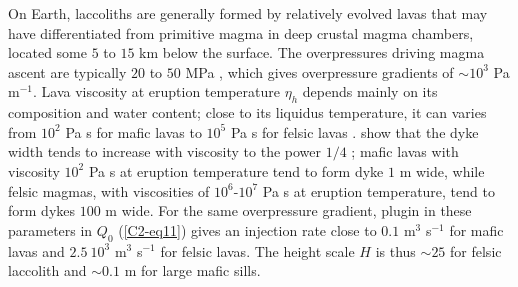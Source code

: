 On Earth, laccoliths are generally  formed by relatively evolved lavas
that  may have  differentiated from  primitive magma  in deep  crustal
magma chambers,  located some $5$  to $15$  km below the  surface. The
overpressures  driving magma  ascent are  typically $20$  to $50$  MPa
\citep{Stasiuk:1993kg,Barmin:2002ea},    which   gives    overpressure
gradients  of $\sim  10^3$ Pa  m$^{−1}$.  Lava  viscosity at  eruption
temperature  $\eta_h$  depends mainly  on  its  composition and  water
content; close to its liquidus  temperature, it can varies from $10^2$
Pa  s   for  mafic   lavas  to   $10^{5}$  Pa   s  for   felsic  lavas
\citep{Anonymous:CZVBrBvv,Giordano:2008em,Whittington:2009fv,Chevrel:2013jn}.
\citet{Wada:2007tv} show  that the dyke  width tends to  increase with
viscosity  to the  power $1/4$  \citep{Kerr:1995tl}; mafic  lavas with
viscosity $10^2$ Pa s at eruption  temperature tend to form dyke $1$ m
wide, while felsic  magmas, with viscosities of $10^6$-$10^7$  Pa s at
eruption temperature, tend  to form dykes $100$ m wide.   For the same
overpressure   gradient,  plugin   in   these   parameters  in   $Q_0$
(\ref{C2-eq11}) gives an injection rate  close to $0.1$ m$^3$ s$^{-1}$
for mafic  lavas and $2.5~10^3$  m$^3$ s$^{-1}$ for felsic  lavas. The
height scale $H$ is thus $\sim 25$ for felsic laccolith and $\sim 0.1$
m for large mafic sills.

